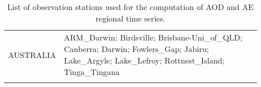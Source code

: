 \begin{table}
\begin{tabularx}{\textwidth}{lX}
  AUSTRALIA & ARM\_Darwin; Birdsville; Brisbane-Uni\_of\_QLD; Canberra; Darwin; Fowlers\_Gap; Jabiru; Lake\_Argyle; Lake\_Lefroy; Rottnest\_Island; Tinga\_Tingana                                                                                                                                                                                                                                                                                                                                                                                                                                                                                                                                                                                                                                                                                                                                                                                                                                                                                                                                                                                                                                                                                                                                                                                                                                                                                                          \\
  \bottomhline
 \end{tabularx}
 \caption{List of observation stations used for the computation of AOD and AE regional time series.}
 \label{table:stations_aerosun}
\end{table}

\clearpage


